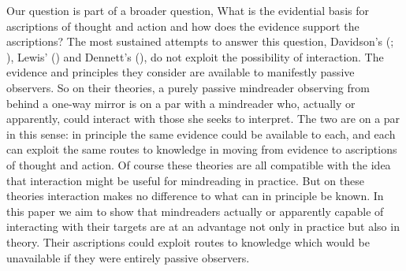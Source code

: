 \documentclass[12pt,\papersize]{extarticle}
\begin{document}
Our question is part of a broader question,
What is the evidential basis for ascriptions of thought and action and how does the evidence support the ascriptions?
The most sustained attempts to answer this question,
Davidson's (\citeyear{Davidson:1984wh}; \citeyear{Davidson:1990du}), Lewis' (\citeyear{lewis:1974ri}) and Dennett's (\citeyear{Dennett:1987sf}),
do not exploit the possibility of interaction.
The evidence and principles they consider are available to manifestly passive observers.
So on their theories,
a purely passive mindreader observing from behind a one-way mirror
is on a par with
a mindreader who, actually or apparently, could interact with those she seeks to interpret.
The two are on a par in this sense:
in principle the same evidence could be available to each, and each can exploit the 
same 
routes to knowledge in moving from evidence to ascriptions of thought and action.
Of course these theories are all compatible with the idea that interaction might be useful for mindreading in practice.  
But on these theories interaction makes no difference to what can in principle be known.
In this paper we aim to show
that mindreaders actually or apparently capable of interacting with their targets are at an advantage not only in practice but also in theory.
Their ascriptions could exploit routes to knowledge which would be unavailable if they were entirely passive observers.
\end{document}
